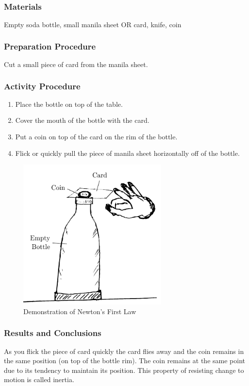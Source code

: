 \subsubsection*{Materials}
Empty soda bottle, small manila sheet OR card, knife, coin

\subsubsection*{Preparation Procedure}
Cut a small piece of card from the manila sheet.

\subsubsection*{Activity Procedure}
\begin{enumerate}
\item{Place the bottle on top of the table.} 
\item{Cover the mouth of the bottle with the card.} 
\item{Put a coin on top of the card on the rim of the bottle.} 
\item{Flick or quickly pull the piece of manila sheet horizontally off of the bottle.} 
\end{enumerate}

\begin{figure}
\begin{center}
\includegraphics{./img/inertia.png}
\caption{Demonstration of Newton's First Law}
\label{fig:inertia}
\end{center}
\end{figure}

\subsubsection*{Results and Conclusions}
As you flick the piece of card quickly the card flies away and the coin remains in the same position (on top of the bottle rim). The coin remains at the same point due to its tendency to maintain its position. This property of resisting change to motion is called inertia.

